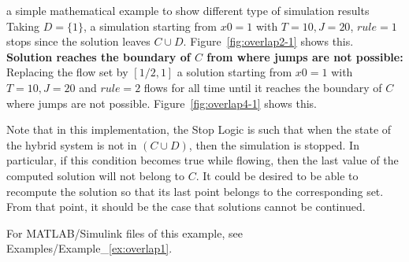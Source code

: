 \begin{example}{a simple mathematical example to show different type of simulation results}
Taking $D = \{1\}$, a simulation starting from $x0=1$ with $T=10,J=20$, $rule = 1$ stops since the solution leaves $C\cup D$. Figure~\ref{fig:overlap2-1} shows this.
\\

{\bf Solution reaches the boundary of $C$ from where jumps are not possible:}
\\

Replacing the flow set by  $[1/2,1]$
a solution starting from $x0=1$ with $T=10,J=20$ and $rule = 2$
flows for all time until it reaches the boundary of
$C$ where jumps are not possible. Figure~\ref{fig:overlap4-1}
shows this.


Note that in this implementation, the Stop Logic is such that when the
state of the hybrid system is not in $(C \cup D)$, then the
simulation is stopped. In particular, if this condition becomes true
while flowing, then the last value of the computed solution will not
belong to $C$. It
could be desired to be able to recompute the solution so that its last
point belongs to the corresponding set. From that point, it should be
the case that solutions cannot be continued.



For MATLAB/Simulink files of this example, see Examples/Example\_\ref{ex:overlap1}.
\end{example}




